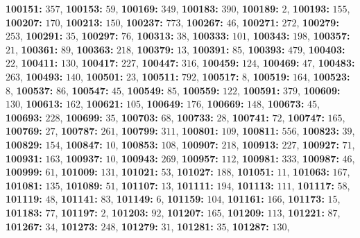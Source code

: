 \textsf{\bfseries 100151:} $357$, \textsf{\bfseries 100153:} $59$, \textsf{\bfseries 100169:} $349$, \textsf{\bfseries 100183:} $390$, \textsf{\bfseries 100189:} $2$, \textsf{\bfseries 100193:} $155$, \textsf{\bfseries 100207:} $170$, \textsf{\bfseries 100213:} $150$, \textsf{\bfseries 100237:} $773$, \textsf{\bfseries 100267:} $46$, \textsf{\bfseries 100271:} $272$, \textsf{\bfseries 100279:} $253$, \textsf{\bfseries 100291:} $35$, \textsf{\bfseries 100297:} $76$, \textsf{\bfseries 100313:} $38$, \textsf{\bfseries 100333:} $101$, \textsf{\bfseries 100343:} $198$, \textsf{\bfseries 100357:} $21$, \textsf{\bfseries 100361:} $89$, \textsf{\bfseries 100363:} $218$, \textsf{\bfseries 100379:} $13$, \textsf{\bfseries 100391:} $85$, \textsf{\bfseries 100393:} $479$, \textsf{\bfseries 100403:} $22$, \textsf{\bfseries 100411:} $130$, \textsf{\bfseries 100417:} $227$, \textsf{\bfseries 100447:} $316$, \textsf{\bfseries 100459:} $124$, \textsf{\bfseries 100469:} $47$, \textsf{\bfseries 100483:} $263$, \textsf{\bfseries 100493:} $140$, \textsf{\bfseries 100501:} $23$, \textsf{\bfseries 100511:} $792$, \textsf{\bfseries 100517:} $8$, \textsf{\bfseries 100519:} $164$, \textsf{\bfseries 100523:} $8$, \textsf{\bfseries 100537:} $86$, \textsf{\bfseries 100547:} $45$, \textsf{\bfseries 100549:} $85$, \textsf{\bfseries 100559:} $122$, \textsf{\bfseries 100591:} $379$, \textsf{\bfseries 100609:} $130$, \textsf{\bfseries 100613:} $162$, \textsf{\bfseries 100621:} $105$, \textsf{\bfseries 100649:} $176$, \textsf{\bfseries 100669:} $148$, \textsf{\bfseries 100673:} $45$, \textsf{\bfseries 100693:} $228$, \textsf{\bfseries 100699:} $35$, \textsf{\bfseries 100703:} $68$, \textsf{\bfseries 100733:} $28$, \textsf{\bfseries 100741:} $72$, \textsf{\bfseries 100747:} $165$, \textsf{\bfseries 100769:} $27$, \textsf{\bfseries 100787:} $261$, \textsf{\bfseries 100799:} $311$, \textsf{\bfseries 100801:} $109$, \textsf{\bfseries 100811:} $556$, \textsf{\bfseries 100823:} $39$, \textsf{\bfseries 100829:} $154$, \textsf{\bfseries 100847:} $10$, \textsf{\bfseries 100853:} $108$, \textsf{\bfseries 100907:} $218$, \textsf{\bfseries 100913:} $227$, \textsf{\bfseries 100927:} $71$, \textsf{\bfseries 100931:} $163$, \textsf{\bfseries 100937:} $10$, \textsf{\bfseries 100943:} $269$, \textsf{\bfseries 100957:} $112$, \textsf{\bfseries 100981:} $333$, \textsf{\bfseries 100987:} $46$, \textsf{\bfseries 100999:} $61$, \textsf{\bfseries 101009:} $131$, \textsf{\bfseries 101021:} $53$, \textsf{\bfseries 101027:} $188$, \textsf{\bfseries 101051:} $11$, \textsf{\bfseries 101063:} $167$, \textsf{\bfseries 101081:} $135$, \textsf{\bfseries 101089:} $51$, \textsf{\bfseries 101107:} $13$, \textsf{\bfseries 101111:} $194$, \textsf{\bfseries 101113:} $111$, \textsf{\bfseries 101117:} $58$, \textsf{\bfseries 101119:} $48$, \textsf{\bfseries 101141:} $83$, \textsf{\bfseries 101149:} $6$, \textsf{\bfseries 101159:} $104$, \textsf{\bfseries 101161:} $166$, \textsf{\bfseries 101173:} $15$, \textsf{\bfseries 101183:} $77$, \textsf{\bfseries 101197:} $2$, \textsf{\bfseries 101203:} $92$, \textsf{\bfseries 101207:} $165$, \textsf{\bfseries 101209:} $113$, \textsf{\bfseries 101221:} $87$, \textsf{\bfseries 101267:} $34$, \textsf{\bfseries 101273:} $248$, \textsf{\bfseries 101279:} $31$, \textsf{\bfseries 101281:} $35$, \textsf{\bfseries 101287:} $130$, 
